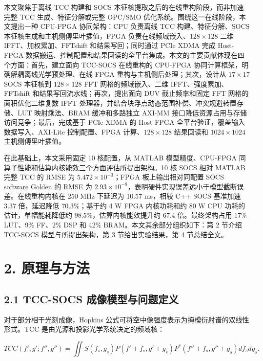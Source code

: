 \documentclass[
  preprint]{elsarticle}
\begin{document}
本文聚焦于离线 TCC 构建和 SOCS
本征核提取之后的在线重构阶段，而非加速完整 TCC 生成、特征分解或完整
OPC/SMO 优化系统。围绕这一在线阶段，本文提出一种 CPU-FPGA 协同架构：CPU
负责离线 TCC 构建、特征分解、SOCS 本征核生成和主机侧傅里叶插值，FPGA
负责在线频域嵌入、\(128 \times 128\) 二维 IFFT、加权累加、FFTshift
和结果写回；同时通过 PCIe XDMA 完成 Host-FPGA
数据搬运、控制配置和结果回读的全平台集成。本文的主要贡献体现在四个方面：首先，建立面向
TCC-SOCS 在线重构的 CPU-FPGA 协同计算框架，明确解耦离线光学预处理、在线
FPGA 重构与主机侧后处理；其次，设计从 \(17 \times 17\) SOCS 本征核到
\(128 \times 128\) FFT 网格的频域嵌入、二维 IFFT、强度累加、FFTshift
和结果写回流水线；再次，提出面向 DUV 截止频率和固定 FFT
网格的面积优化二维复数 IFFT
处理器，并结合块浮点动态范围补偿、冲突规避转置存储、LUT 映射乘法、BRAM
缓冲和多路独立 AXI-MM 接口降低资源占用与存储访问竞争；最后，完成基于
PCIe XDMA 的 Host-FPGA 全平台验证，覆盖输入数据写入、AXI-Lite
控制配置、FPGA 计算、\(128 \times 128\) 结果回读和 \(1024 \times 1024\)
主机侧傅里叶插值。

在此基础上，本文采用固定 10 核配置，从 MATLAB 模型精度、CPU-FPGA
同算子性能和估算内核能效三个方面评估所提出架构。10 核 SOCS 相对 MATLAB
完整 TCC 的 RMSE 为 \(5.472\times10^{-3}\)；FPGA 板上输出相对同配置 SOCS
software Golden 的 RMSE 为
\(2.93\times10^{-8}\)，表明硬件实现误差远小于模型截断误差。在线重构内核在
250 MHz 下延迟为 10.57 ms，相较 C++ SOCS 基准加速 3.37 倍，延迟降低
70.3\%；基于约 4 W FPGA 内核功耗和约 80 W CPU 功耗的估计，单幅能耗降低约
98.5\%，估算内核能效提升约 67.4 倍。最终架构占用 17\% LUT、9\% FF、2\%
DSP 和 42\% BRAM。本文其余部分组织如下：第 2 节介绍 TCC-SOCS
模型与所提出架构，第 3 节给出实验结果，第 4 节总结全文。

\section{2. 原理与方法}\label{ux539fux7406ux4e0eux65b9ux6cd5}

\subsection{2.1 TCC-SOCS
成像模型与问题定义}\label{tcc-socs-ux6210ux50cfux6a21ux578bux4e0eux95eeux9898ux5b9aux4e49}

对于部分相干光刻成像，Hopkins
公式可将空中像强度表示为掩模衍射谱的双线性形式。TCC
是由光源和投影光学系统决定的频域核：

\[
TCC(f',g';f'',g'') =
\iint S(f_s,g_s)P(f'+f_s,g'+g_s)P^*(f''+f_s,g''+g_s)df_sdg_s.
\tag{1}
\]
\end{document}
